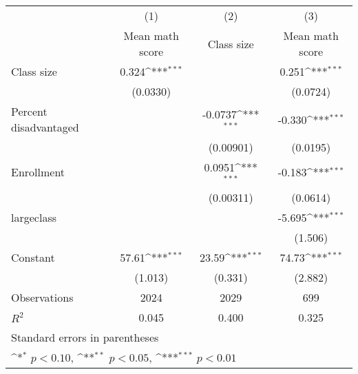 {
\def\sym#1{\ifmmode^{#1}\else\(^{#1}\)\fi}
\begin{tabular}{l*{3}{c}}
\hline\hline
                    &\multicolumn{1}{c}{(1)}&\multicolumn{1}{c}{(2)}&\multicolumn{1}{c}{(3)}\\
                    &\multicolumn{1}{c}{Mean math score}&\multicolumn{1}{c}{Class size}&\multicolumn{1}{c}{Mean math score}\\
\hline
Class size          &       0.324\sym{***}&                     &       0.251\sym{***}\\
                    &    (0.0330)         &                     &    (0.0724)         \\
[1em]
Percent disadvantaged&                     &     -0.0737\sym{***}&      -0.330\sym{***}\\
                    &                     &   (0.00901)         &    (0.0195)         \\
[1em]
Enrollment          &                     &      0.0951\sym{***}&      -0.183\sym{***}\\
                    &                     &   (0.00311)         &    (0.0614)         \\
[1em]
largeclass          &                     &                     &      -5.695\sym{***}\\
                    &                     &                     &     (1.506)         \\
[1em]
Constant            &       57.61\sym{***}&       23.59\sym{***}&       74.73\sym{***}\\
                    &     (1.013)         &     (0.331)         &     (2.882)         \\
\hline
Observations        &        2024         &        2029         &         699         \\
\(R^{2}\)           &       0.045         &       0.400         &       0.325         \\
\hline\hline
\multicolumn{4}{l}{\footnotesize Standard errors in parentheses}\\
\multicolumn{4}{l}{\footnotesize \sym{*} \(p<0.10\), \sym{**} \(p<0.05\), \sym{***} \(p<0.01\)}\\
\end{tabular}
}
